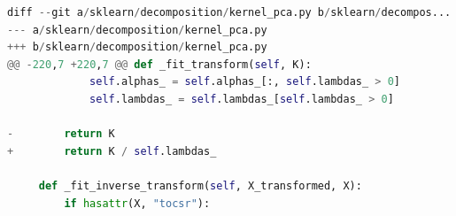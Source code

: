 \lstset{linewidth=\linewidth}
\lstset{basicstyle=\small\ttfamily}

\begin{lstlisting}[language=Python,belowskip=-0.8 \baselineskip]
diff --git a/sklearn/decomposition/kernel_pca.py b/sklearn/decompos...
--- a/sklearn/decomposition/kernel_pca.py
+++ b/sklearn/decomposition/kernel_pca.py
@@ -220,7 +220,7 @@ def _fit_transform(self, K):
             self.alphas_ = self.alphas_[:, self.lambdas_ > 0]
             self.lambdas_ = self.lambdas_[self.lambdas_ > 0]
 
-        return K
+        return K / self.lambdas_
 
     def _fit_inverse_transform(self, X_transformed, X):
         if hasattr(X, "tocsr"):
\end{lstlisting}